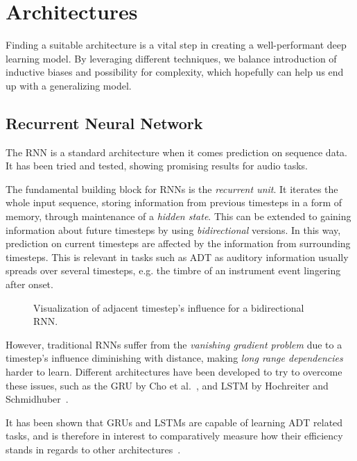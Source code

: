 \chapter{Architectures}\label{Architectures}

Finding a suitable architecture is a vital step in creating a well-performant deep learning model. By leveraging different techniques, we balance introduction of inductive biases and possibility for complexity, which hopefully can help us end up with a generalizing model.

\section{Recurrent Neural Network}

The \gls{RNN} is a standard architecture when it comes prediction on sequence data. It has been tried and tested, showing promising results for audio tasks.

The fundamental building block for \glspl{RNN} is the \textit{recurrent unit}. It iterates the whole input sequence, storing information from previous timesteps in a form of memory, through maintenance of a \textit{hidden state}. This can be extended to gaining information about future timesteps by using \textit{bidirectional} versions. In this way, prediction on current timesteps are affected by the information from surrounding timesteps. This is relevant in tasks such as \gls{ADT} as auditory information usually spreads over several timesteps, e.g. the timbre of an instrument event lingering after onset.

\begin{figure}[H]
    \centering
    
    \caption{Visualization of adjacent timestep's influence for a bidirectional RNN.}
    \label{RNNInfluenceFigure}
\end{figure}

However, traditional \glspl{RNN} suffer from the \textit{vanishing gradient problem} due to a timestep's influence diminishing with distance, making \textit{long range dependencies} harder to learn. Different architectures have been developed to try to overcome these issues, such as the \gls{GRU} by Cho et al.~\cite{DBLP:conf/emnlp/ChoMGBBSB14}, and \gls{LSTM} by Hochreiter and Schmidhuber~\cite{10.1162/neco.1997.9.8.1735}.

It has been shown that \glspl{GRU} and \glspl{LSTM} are capable of learning \gls{ADT} related tasks, and is therefore in interest to comparatively measure how their efficiency stands in regards to other architectures~\cite{Southall2016AutomaticDT, vogl2016recurrent, Vogl2017DrumTV, signals4040042}.

